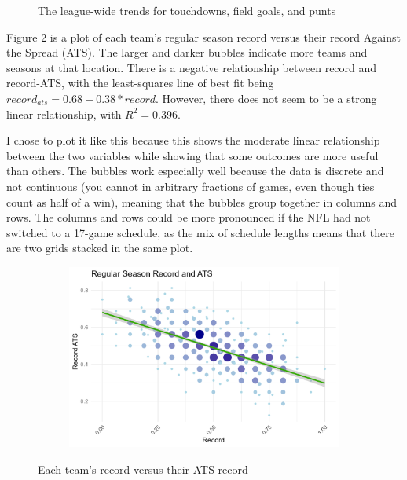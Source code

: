 \documentclass{article}
\begin{document}
\begin{figure}[ht]
\begin{subfigure}{0.32\textwidth}
    \end{subfigure}
    \caption{The league-wide trends for touchdowns, field goals, and punts}
\end{figure}

Figure 2 is a plot of each team's regular season record
versus their record Against the Spread (ATS).
The larger and darker bubbles indicate more teams and seasons at that location.
There is a negative relationship between record and record-ATS,
with the least-squares line of best fit being $record_{ats} = 0.68 - 0.38 * record$. 
However, there does not seem to be a strong linear relationship, with $R^{2}=0.396$.

I chose to plot it like this because this shows the moderate linear relationship between the 
two variables while showing that some outcomes are more useful than others. The bubbles work 
especially well because the data is discrete and not continuous (you cannot in arbitrary fractions
of games, even though ties count as half of a win), meaning that the bubbles group together in columns
and rows. The columns and rows could be more pronounced if the NFL had not switched to a 17-game schedule,
as the mix of schedule lengths means that there are two grids stacked in the same plot.

\begin{figure}[ht]
    \centering
    \begin{subfigure}{0.7\textwidth}
        \centering
        \includegraphics[width=\textwidth]{../plots/record_vs_ats.png}
    \end{subfigure}\hfill
    \caption{Each team's record versus their ATS record}
\end{figure}
\end{document}
